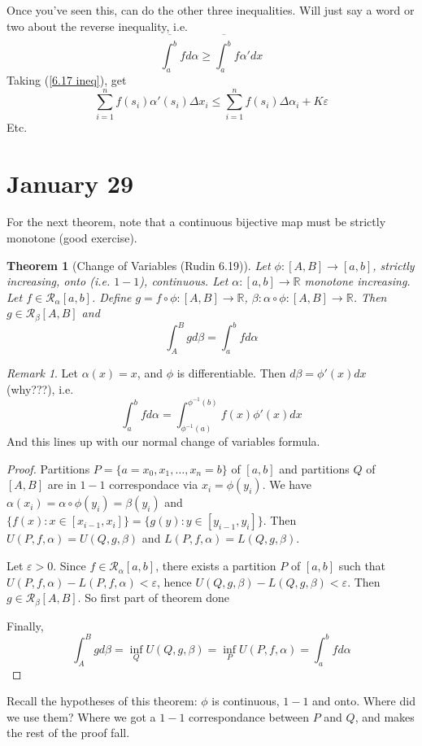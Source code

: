 \documentclass{article}
\theoremstyle{plain}
\newtheorem{theorem}{Theorem}
\theoremstyle{remark}
\newtheorem{remark}{Remark}
\newcommand{\R}{{\mathbb R}}
\newcommand{\ep}{{\varepsilon}}
\begin{document}
Once you've seen this, can do the other three inequalities.
Will just say a word or two about the reverse inequality, i.e.
\[
	\overline{\int_a^b}fd\alpha \geq \overline{\int_a^b}f\alpha'dx
\]
Taking (\ref{6.17 ineq}), get
\[
	\sum_{i=1}^n f(s_i) \alpha'(s_i)\Delta x_i \leq
	\sum_{i=1}^n f(s_i)\Delta\alpha_i + K\ep
\]
Etc.

\section{January 29}
For the next theorem, note that a continuous bijective map
must be strictly monotone (good exercise).
\begin{theorem}[Change of Variables (Rudin 6.19)]
	Let $\phi \colon [A,B] \to [a,b]$, strictly increasing,
	onto (i.e. $1-1$), continuous.
	Let $\alpha \colon [a,b] \to \R$ monotone increasing.
	Let $f \in \mathcal{R}_\alpha[a,b]$.
	Define $g = f \circ \phi \colon [A,B] \to \R$,
	$\beta \colon \alpha \circ \phi \colon [A,B] \to \R$.
	Then $g \in \mathcal{R}_\beta[A,B]$ and
	\[
		\int_A^B gd\beta = \int_a^b fd\alpha
	\]
\end{theorem}

\begin{remark}
	Let $\alpha(x) = x$, and $\phi$ is differentiable.
	Then $d\beta = \phi'(x)dx$ (why???), i.e.
	\[
		\int_a^b fd\alpha = \int_{\phi^{-1}(a)}^{\phi^{-1}(b)}f(x)\phi'(x)dx
	\]
	And this lines up with our normal change of variables formula.
\end{remark}
\begin{proof}
	Partitions $P = \{a=x_0, x_1,\dots,x_n = b\}$ of $[a,b]$
	and partitions $Q$ of $[A,B]$
	are in $1-1$ correspondace via $x_i = \phi(y_i)$.
	We have $\alpha(x_i) = \alpha \circ \phi(y_i) = \beta(y_i)$
	and $\{f(x) \colon x \in [x_{i-1},x_i]\} = \{g(y) \colon y \in [y_{i-1},y_i]\}$.
	Then $U(P,f,\alpha) = U(Q,g,\beta)$ and $L(P,f,\alpha) = L(Q,g,\beta)$.

	Let $\ep > 0$. Since $f \in \mathcal{R}_\alpha[a,b]$,
	there exists a partition $P$ of $[a,b]$ such that
	$U(P,f,\alpha) - L(P,f,\alpha) < \ep$,
	hence $U(Q,g,\beta) - L(Q,g,\beta) < \ep$.
	Then $g \in \mathcal{R}_\beta[A,B]$.
	So first part of theorem done \checkmark

	Finally,
	\[
		\int_A^B g d\beta = \inf_Q U(Q,g,\beta)
		= \inf_P U(P,f,\alpha) = \int_a^b f d\alpha
	\]
\end{proof}

Recall the hypotheses of this theorem:
$\phi$ is continuous, $1-1$ and onto.
Where did we use them?
Where we got a $1-1$ correspondance between $P$ and $Q$,
and makes the rest of the proof fall.
\end{document}
